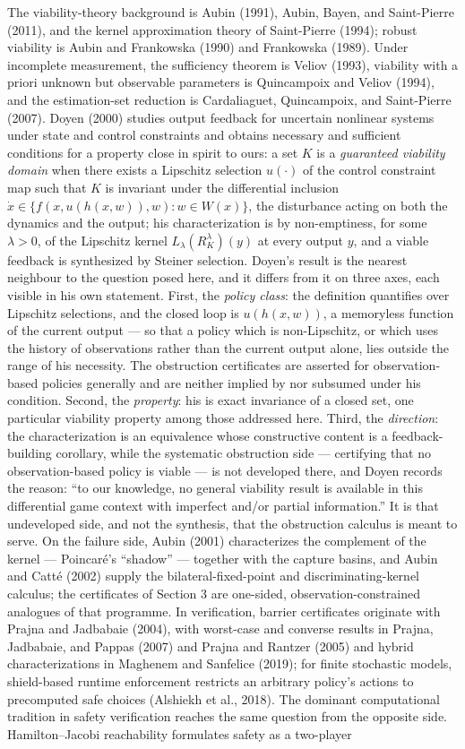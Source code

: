 \documentclass[10pt,twocolumn]{article}
\theoremstyle{definition}
\begin{document}
The viability-theory background is Aubin (1991), Aubin, Bayen, and Saint-Pierre (2011), and the kernel approximation theory of Saint-Pierre (1994); robust viability is Aubin and Frankowska (1990) and Frankowska (1989). Under incomplete measurement, the sufficiency theorem is Veliov (1993), viability with a priori unknown but observable parameters is Quincampoix and Veliov (1994), and the estimation-set reduction is Cardaliaguet, Quincampoix, and Saint-Pierre (2007).  Doyen (2000) studies output feedback for uncertain nonlinear systems under state and control constraints and obtains necessary and sufficient conditions for a property close in spirit to ours: a set \(K\) is a \emph{guaranteed viability domain} when there exists a Lipschitz selection
\(u(\cdot)\) of the control constraint map such that \(K\) is invariant under the
differential inclusion \(\dot x \in \{f(x,u(h(x,w)),w): w \in W(x)\}\), the disturbance
acting on both the dynamics and the output; his characterization is by non-emptiness, for
some \(\lambda>0\), of the Lipschitz kernel \(L_{\lambda}(R^{\lambda}_{K})(y)\) at every
output \(y\), and a viable feedback is synthesized by Steiner selection.  Doyen's result is
the nearest neighbour to the question posed here, and it differs from it on three axes, each
visible in his own statement.  First, the \emph{policy class}: the definition quantifies over
Lipschitz selections, and the closed loop is \(u(h(x,w))\), a memoryless function of the
current output --- so that a policy which is non-Lipschitz, or which uses the history of
observations rather than the current output alone, lies outside the range of his necessity.
The obstruction certificates are asserted for observation-based policies generally and are
neither implied by nor subsumed under his condition.  Second, the \emph{property}: his is
exact invariance of a closed set, one particular viability property among those addressed
here.  Third, the \emph{direction}: the characterization is an equivalence whose constructive
content is a feedback-building corollary, while the systematic obstruction side ---
certifying that no observation-based policy is viable --- is not developed there, and Doyen
records the reason: ``to our knowledge, no general viability result is available in this
differential game context with imperfect and/or partial information.''  It is that
undeveloped side, and not the synthesis, that the obstruction calculus is meant to serve. On the failure side, Aubin (2001) characterizes the complement of the kernel --- Poincar\'e's ``shadow'' --- together with the capture basins, and Aubin and Catt\'e (2002) supply the bilateral-fixed-point and discriminating-kernel calculus; the certificates of Section 3 are one-sided, observation-constrained analogues of that programme. In verification, barrier certificates originate with Prajna and Jadbabaie (2004), with worst-case and converse results in Prajna, Jadbabaie, and Pappas (2007) and Prajna and Rantzer (2005) and hybrid characterizations in Maghenem and Sanfelice (2019); for finite stochastic models, shield-based runtime enforcement restricts an arbitrary policy's actions to precomputed safe choices (Alshiekh et al., 2018). The dominant computational tradition in safety verification reaches the same question from the opposite side.  Hamilton--Jacobi reachability formulates safety as a two-player
\end{document}
